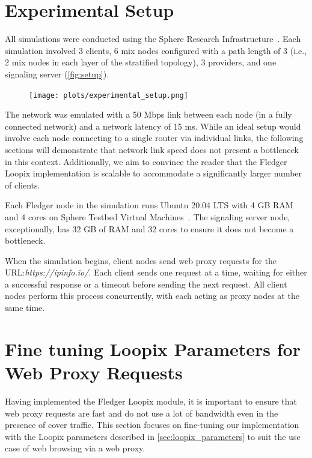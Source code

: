 \documentclass[a4paper,11pt,oneside]{report}
\begin{document}
\section{Experimental Setup}
\label{sec:setup}
All simulations were conducted using the Sphere Research Infrastructure~\cite{sphere_infrastructure}. Each simulation involved 3 clients, 6 mix nodes configured with a path length of 3 (i.e., 2 mix nodes in each layer of the stratified topology), 3 providers, and one signaling server (\autoref{fig:setup}).

\begin{figure}[H]
    \centering
    \texttt{[image: plots/experimental\_setup.png]}
    \caption{}
    \label{fig:setup}
\end{figure}


The network was emulated with a 50 Mbps link between each node (in a fully connected network) and a network latency of 15 ms. While an ideal setup would involve each node connecting to a single router via individual links, the following sections will demonstrate that network link speed does not present a bottleneck in this context. Additionally, we aim to convince the reader that the Fledger Loopix implementation is scalable to accommodate a significantly larger number of clients.

Each Fledger node in the simulation runs Ubuntu 20.04 LTS with 4 GB RAM and 4 cores on Sphere Testbed Virtual Machines~\cite{sphere_experimentation}. The signaling server node, exceptionally, has 32 GB of RAM and 32 cores to ensure it does not become a bottleneck.

When the simulation begins, client nodes send web proxy requests for the URL:\textit{https://ipinfo.io/}. Each client sends one request at a time, waiting for either a successful response or a timeout before sending the next request. All client nodes perform this process concurrently, with each acting as proxy nodes at the same time.

\section{Fine tuning Loopix Parameters for Web Proxy Requests}
\label{sec:finetune}

Having implemented the Fledger Loopix module, it is important to ensure that web proxy requests are fast and do not use a lot of bandwidth even in the presence of cover traffic. This section focuses on fine-tuning our implementation with the Loopix parameters described in \autoref{sec:loopix_parameters} to suit the use case of web browsing via a web proxy.
\end{document}
